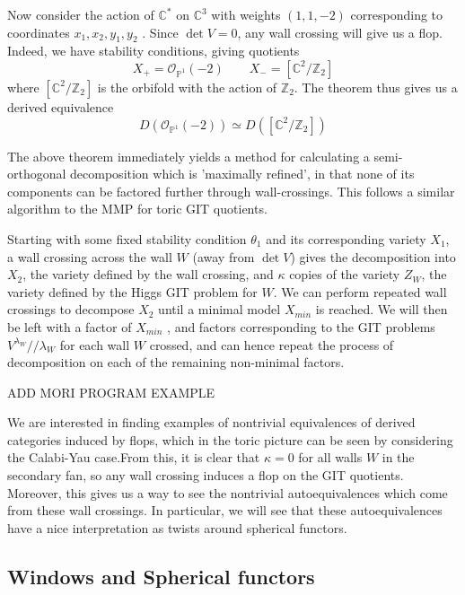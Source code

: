 \begin{example}{}{}
    Now consider the action of $\mathbb{C}^{*}$ on $\mathbb{C}^3$ with weights $(1,1,-2)$ corresponding to coordinates $x_{1},x_{2},y_1,y_2$ .  Since $\det V = 0$, any wall crossing will give us a flop. Indeed, we have stability conditions, giving quotients $$X_{+}= \mathcal{O}_{\mathbb{P}^{1}}(-2) \qquad X_{-}= [\mathbb{C}^{2}/ \mathbb{Z}_2]  $$where $[\mathbb{C}^2/\mathbb{Z}_2]$ is the orbifold with the action of $\mathbb{Z}_2$. The theorem thus gives us a derived equivalence $$D(\mathcal{O}_{\mathbb{P}^{1}}(-2))\simeq D([\mathbb{C}^{2}/\mathbb{Z}_{2}])$$
\end{example}


The above theorem immediately yields a method for calculating a semi-orthogonal decomposition which is 'maximally refined', in that none of its components can be factored further through wall-crossings. This follows a similar algorithm to the MMP for toric GIT quotients. 

Starting with some fixed stability condition $\theta _1$ and its corresponding variety $X_1$, a wall crossing across the wall $W$ (away from $\det V$) gives the decomposition into $X_2$, the variety defined by the wall crossing, and $\kappa$ copies of the variety $Z_W$, the variety defined by the Higgs GIT problem for $W$. We can perform repeated wall crossings to decompose $X_2$ until a minimal model $X_{min}$ is reached. We will then be left with a factor of $X_{min}$ , and factors corresponding to the GIT problems $V^{\lambda_{W}} / / \lambda_{W}$ for each wall $W$ crossed, and can hence repeat the process of decomposition on each of the remaining non-minimal factors.

ADD MORI PROGRAM EXAMPLE

We are interested in finding examples of nontrivial equivalences of derived categories induced by flops, which in the toric picture can be seen by considering the Calabi-Yau case.From this, it is clear that $\kappa = 0$ for all walls $W$ in the secondary fan, so any wall crossing induces a flop on the GIT quotients. Moreover, this gives us a way to see the nontrivial autoequivalences which come from these wall crossings. In particular, we will see that these autoequivalences have a nice interpretation as twists around spherical functors. 

\subsection{Windows and Spherical functors}


